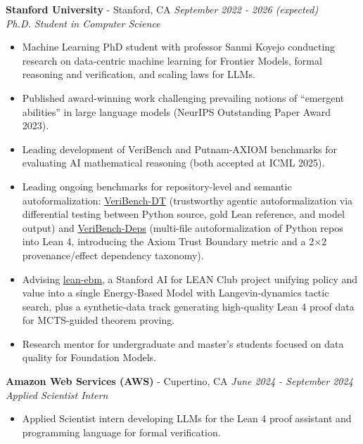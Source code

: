\documentclass{article}
\newenvironment{changemargin}[2]{%
  \begin{list}{}{%
    \setlength{\topsep}{0pt}%
    \setlength{\leftmargin}{#1}%
    \setlength{\rightmargin}{#2}%
    \setlength{\listparindent}{\parindent}%
    \setlength{\itemindent}{\parindent}%
    \setlength{\parsep}{\parskip}%
  }%
  \item[]}{\end{list}
}
\newenvironment{body} {
	\vspace*{-16pt}
	\begin{changemargin}{-0.25in}{-0.5in}
  }	
	{\end{changemargin}
}
\begin{document}
\begin{body}
	\vspace{16pt}
 
 	\textbf{Stanford University} - Stanford, CA \hfill \emph{September 2022 - 2026 (expected)}\\
	\emph{Ph.D. Student in Computer Science}\\
	\vspace*{-3pt}
	\begin{itemize} \itemsep -2pt  %
		\item Machine Learning PhD student with professor Sanmi Koyejo conducting research on data-centric machine learning for Frontier Models, formal reasoning and verification, and scaling laws for LLMs.
		\item Published award-winning work challenging prevailing notions of ``emergent abilities'' in large language models (NeurIPS Outstanding Paper Award 2023).
		\item Leading development of VeriBench and Putnam-AXIOM benchmarks for evaluating AI mathematical reasoning (both accepted at ICML 2025).
		\item Leading ongoing benchmarks for repository-level and semantic autoformalization: \href{https://github.com/brando90/veribench-dt}{VeriBench-DT} (trustworthy agentic autoformalization via differential testing between Python source, gold Lean reference, and model output) and \href{https://github.com/brando90/veribench-deps}{VeriBench-Deps} (multi-file autoformalization of Python repos into Lean 4, introducing the Axiom Trust Boundary metric and a 2$\times$2 provenance/effect dependency taxonomy).
		\item Advising \href{https://github.com/Stanford-AI-for-LEAN-Club/lean-ebm}{lean-ebm}, a Stanford AI for LEAN Club project unifying policy and value into a single Energy-Based Model with Langevin-dynamics tactic search, plus a synthetic-data track generating high-quality Lean 4 proof data for MCTS-guided theorem proving.
		\item Research mentor for undergraduate and master's students focused on data quality for Foundation Models.
	\end{itemize}
	\vspace{5 pt}

	\textbf{Amazon Web Services (AWS)} - Cupertino, CA \hfill \emph{June 2024 - September 2024}\\
	\emph{Applied Scientist Intern}\\
	\vspace*{-3pt}
	\begin{itemize} \itemsep -2pt
		\item Applied Scientist intern developing LLMs for the Lean 4 proof assistant and programming language for formal verification.
	\end{itemize}
	\vspace{5 pt}


\end{body}
\end{document}

